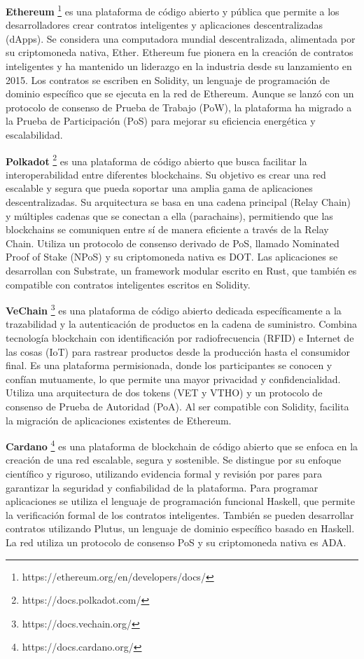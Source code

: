 \textbf{Ethereum} \footnote{https://ethereum.org/en/developers/docs/}
es una plataforma de código abierto y pública que permite a los desarrolladores crear contratos inteligentes y aplicaciones descentralizadas (dApps). Se considera una computadora mundial descentralizada, alimentada por su criptomoneda nativa, Ether. Ethereum fue pionera en la creación de contratos inteligentes y ha mantenido un liderazgo en la industria desde su lanzamiento en 2015. Los contratos se escriben en Solidity, un lenguaje de programación de dominio específico que se ejecuta en la red de Ethereum. Aunque se lanzó con un protocolo de consenso de Prueba de Trabajo (PoW), la plataforma ha migrado a la Prueba de Participación (PoS) para mejorar su eficiencia energética y escalabilidad.

\textbf{Polkadot} \footnote{https://docs.polkadot.com/}
es una plataforma de código abierto que busca facilitar la interoperabilidad entre diferentes blockchains. Su objetivo es crear una red escalable y segura que pueda soportar una amplia gama de aplicaciones descentralizadas. Su arquitectura se basa en una cadena principal (Relay Chain) y múltiples cadenas que se conectan a ella (parachains), permitiendo que las blockchains se comuniquen entre sí de manera eficiente a través de la Relay Chain. Utiliza un protocolo de consenso derivado de PoS, llamado Nominated Proof of Stake (NPoS) y su criptomoneda nativa es DOT. Las aplicaciones se desarrollan con Substrate, un framework modular escrito en Rust, que también es compatible con contratos inteligentes escritos en Solidity.

\textbf{VeChain} \footnote{https://docs.vechain.org/}
es una plataforma de código abierto dedicada específicamente a la trazabilidad y la autenticación de productos en la cadena de suministro. Combina tecnología blockchain con identificación por radiofrecuencia (RFID) e Internet de las cosas (IoT) para rastrear productos desde la producción hasta el consumidor final. Es una plataforma permisionada, donde los participantes se conocen y confían mutuamente, lo que permite una mayor privacidad y confidencialidad. Utiliza una arquitectura de dos tokens (VET y VTHO) y un protocolo de consenso de Prueba de Autoridad (PoA). Al ser compatible con Solidity, facilita la migración de aplicaciones existentes de Ethereum.

\textbf{Cardano} \footnote{https://docs.cardano.org/}
es una plataforma de blockchain de código abierto que se enfoca en la creación de una red escalable, segura y sostenible. Se distingue por su enfoque científico y riguroso, utilizando evidencia formal y revisión por pares para garantizar la seguridad y confiabilidad de la plataforma. Para programar aplicaciones se utiliza el lenguaje de programación funcional Haskell, que permite la verificación formal de los contratos inteligentes. También se pueden desarrollar contratos utilizando Plutus, un lenguaje de dominio específico basado en Haskell. La red utiliza un protocolo de consenso PoS y su criptomoneda nativa es ADA.

